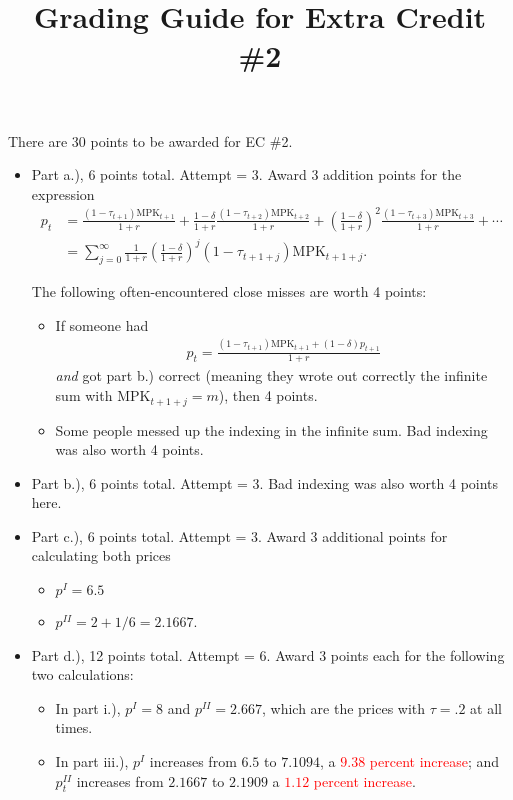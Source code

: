 \documentclass[12pt]{pracjourn_rwr}
\title{Grading Guide for Extra Credit \#2}
\theoremstyle{definition}
\theoremstyle{remark}
\begin{document}
\maketitle


There are 30 points to be awarded for EC \#2.

\begin{itemize}
\item Part a.), 6 points total.
Attempt = 3.
Award 3 addition points for the expression
\begin{align*}
p_{t} &= \frac{(1-\tau_{t+1}) \text{MPK}_{t+1}}{1+r} + \frac{1-\delta}{1+r} \frac{(1-\tau_{t+2}) \text{MPK}_{t+2}}{1+r}
+ \left( \frac{1-\delta}{1+r} \right)^{2} \frac{(1-\tau_{t+3}) \text{MPK}_{t+3}}{1+r} + \cdots \\
&= \sum\limits_{j=0}^{\infty} \frac{1}{1+r} \left( \frac{1-\delta}{1+r} \right)^{j} (1-\tau_{t+1+j}) \text{MPK}_{t+1+j}.
\end{align*}

The following often-encountered close misses are worth 4 points:
\begin{itemize}
\item If someone had
\begin{align*}
p_{t} = \frac{(1-\tau_{t+1}) \text{MPK}_{t+1} + (1-\delta)p_{t+1}}{1+r}
\end{align*}
\emph{and} got part b.) correct (meaning they wrote out correctly the infinite sum with $\text{MPK}_{t+1+j} = m$), then 4 points.
\item Some people messed up the indexing in the infinite sum.
Bad indexing was also worth 4 points.
\end{itemize}
\item Part b.), 6 points total.
Attempt = 3.
Bad indexing was also worth 4 points here.
\item Part c.), 6 points total. Attempt = 3.
Award 3 additional points for calculating both prices
\begin{itemize}
\item $p^{I} = 6.5$
\item $p^{II} = 2 + 1/6 = 2.1667$.
\end{itemize}
\item Part d.), 12 points total. Attempt = 6.
Award 3 points each for the following two calculations:
\begin{itemize}
\item In part i.), $p^{I} = 8$ and $p^{II} = 2.667$, which are the prices with $\tau = .2$ at all times.
\item In part iii.), $p^{I}$ increases from $6.5$ to $7.1094$, a \textcolor{red}{$9.38$ percent increase}; and
$p_{t}^{II}$ increases from $2.1667$ to $2.1909$ a \textcolor{red}{$1.12$ percent increase}.


\end{itemize}
\end{itemize}
\end{document}
